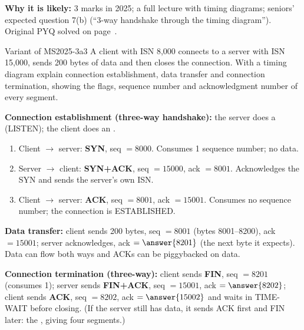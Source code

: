 \textbf{Why it is likely:} 3 marks in 2025; a full lecture with timing diagrams; seniors' expected question 7(b) (``3-way handshake through the timing diagram''). Original PYQ solved on page~\pageref{q:MS2025-3a}.

\begin{question}{Variant of MS2025-3a}{3}
A client with ISN 8,000 connects to a server with ISN 15,000, sends 200 bytes of data and then closes the connection. With a timing diagram explain connection establishment, data transfer and connection termination, showing the flags, sequence number and acknowledgment number of every segment.
\end{question}
\begin{solution}
\textbf{Connection establishment (three-way handshake):} the server does a  (LISTEN); the client does an .
\begin{enumerate}[label=\textbf{\arabic*.}]
\item Client $\to$ server: \textbf{SYN}, seq $=8000$. Consumes 1 sequence number; no data.
\item Server $\to$ client: \textbf{SYN+ACK}, seq $=15000$, ack $=8001$. Acknowledges the SYN and sends the server's own ISN.
\item Client $\to$ server: \textbf{ACK}, seq $=8001$, ack $=15001$. Consumes no sequence number; the connection is ESTABLISHED.
\end{enumerate}
\textbf{Data transfer:}  client sends 200 bytes, seq $=8001$ (bytes 8001--8200), ack $=15001$;  server acknowledges, ack $=\answer{8201}$ (the next byte it expects). Data can flow both ways and ACKs can be piggybacked on data.

\textbf{Connection termination (three-way):}  client sends \textbf{FIN}, seq $=8201$ (consumes 1);  server sends \textbf{FIN+ACK}, seq $=15001$, ack $=\answer{8202}$;  client sends \textbf{ACK}, seq $=8202$, ack $=\answer{15002}$ and waits in TIME-WAIT before closing. (If the server still has data, it sends ACK first and FIN later: the , giving four segments.)
\end{solution}

